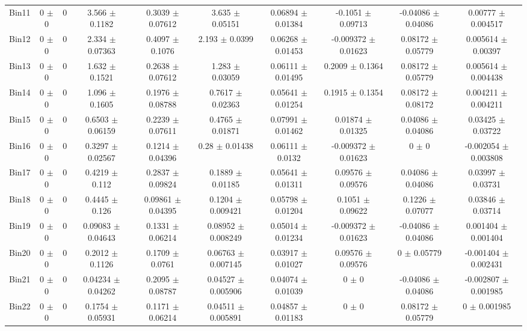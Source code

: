 \begin{tabular}{@{\extracolsep{4pt}}lccccccccc@{}}
     Bin11 & 0 $\pm$ 0 & 0 & 3.566 $\pm$ 0.1182 & 0.3039 $\pm$ 0.07612 & 3.635 $\pm$ 0.05151 & 0.06894 $\pm$ 0.01384 & -0.1051 $\pm$ 0.09713 & -0.04086 $\pm$ 0.04086 & 0.00777 $\pm$ 0.004517 \\ 
     Bin12 & 0 $\pm$ 0 & 0 & 2.334 $\pm$ 0.07363 & 0.4097 $\pm$ 0.1076 & 2.193 $\pm$ 0.0399 & 0.06268 $\pm$ 0.01453 & -0.009372 $\pm$ 0.01623 & 0.08172 $\pm$ 0.05779 & 0.005614 $\pm$ 0.00397 \\ 
     Bin13 & 0 $\pm$ 0 & 0 & 1.632 $\pm$ 0.1521 & 0.2638 $\pm$ 0.07612 & 1.283 $\pm$ 0.03059 & 0.06111 $\pm$ 0.01495 & 0.2009 $\pm$ 0.1364 & 0.08172 $\pm$ 0.05779 & 0.005614 $\pm$ 0.004438 \\ 
     Bin14 & 0 $\pm$ 0 & 0 & 1.096 $\pm$ 0.1605 & 0.1976 $\pm$ 0.08788 & 0.7617 $\pm$ 0.02363 & 0.05641 $\pm$ 0.01254 & 0.1915 $\pm$ 0.1354 & 0.08172 $\pm$ 0.08172 & 0.004211 $\pm$ 0.004211 \\ 
     Bin15 & 0 $\pm$ 0 & 0 & 0.6503 $\pm$ 0.06159 & 0.2239 $\pm$ 0.07611 & 0.4765 $\pm$ 0.01871 & 0.07991 $\pm$ 0.01462 & 0.01874 $\pm$ 0.01325 & 0.04086 $\pm$ 0.04086 & 0.03425 $\pm$ 0.03722 \\ 
     Bin16 & 0 $\pm$ 0 & 0 & 0.3297 $\pm$ 0.02567 & 0.1214 $\pm$ 0.04396 & 0.28 $\pm$ 0.01438 & 0.06111 $\pm$ 0.0132 & -0.009372 $\pm$ 0.01623 & 0 $\pm$ 0 & -0.002054 $\pm$ 0.003808 \\ 
     Bin17 & 0 $\pm$ 0 & 0 & 0.4219 $\pm$ 0.112 & 0.2837 $\pm$ 0.09824 & 0.1889 $\pm$ 0.01185 & 0.05641 $\pm$ 0.01311 & 0.09576 $\pm$ 0.09576 & 0.04086 $\pm$ 0.04086 & 0.03997 $\pm$ 0.03731 \\ 
     Bin18 & 0 $\pm$ 0 & 0 & 0.4445 $\pm$ 0.126 & 0.09861 $\pm$ 0.04395 & 0.1204 $\pm$ 0.009421 & 0.05798 $\pm$ 0.01204 & 0.1051 $\pm$ 0.09622 & 0.1226 $\pm$ 0.07077 & 0.03846 $\pm$ 0.03714 \\ 
     Bin19 & 0 $\pm$ 0 & 0 & 0.09083 $\pm$ 0.04643 & 0.1331 $\pm$ 0.06214 & 0.08952 $\pm$ 0.008249 & 0.05014 $\pm$ 0.01234 & -0.009372 $\pm$ 0.01623 & -0.04086 $\pm$ 0.04086 & 0.001404 $\pm$ 0.001404 \\ 
     Bin20 & 0 $\pm$ 0 & 0 & 0.2012 $\pm$ 0.1126 & 0.1709 $\pm$ 0.0761 & 0.06763 $\pm$ 0.007145 & 0.03917 $\pm$ 0.01027 & 0.09576 $\pm$ 0.09576 & 0 $\pm$ 0.05779 & -0.001404 $\pm$ 0.002431 \\ 
     Bin21 & 0 $\pm$ 0 & 0 & 0.04234 $\pm$ 0.04262 & 0.2095 $\pm$ 0.08787 & 0.04527 $\pm$ 0.005906 & 0.04074 $\pm$ 0.01039 & 0 $\pm$ 0 & -0.04086 $\pm$ 0.04086 & -0.002807 $\pm$ 0.001985 \\ 
     Bin22 & 0 $\pm$ 0 & 0 & 0.1754 $\pm$ 0.05931 & 0.1171 $\pm$ 0.06214 & 0.04511 $\pm$ 0.005891 & 0.04857 $\pm$ 0.01183 & 0 $\pm$ 0 & 0.08172 $\pm$ 0.05779 & 0 $\pm$ 0.001985 \\ 

\end{tabular}
